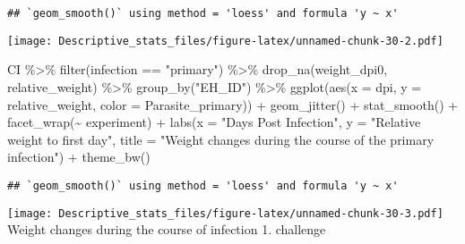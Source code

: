\documentclass[
]{article}
\newenvironment{Shaded}{\begin{snugshade}}{\end{snugshade}}
\newcommand{\AttributeTok}[1]{\textcolor[rgb]{0.77,0.63,0.00}{#1}}
\newcommand{\FunctionTok}[1]{\textcolor[rgb]{0.00,0.00,0.00}{#1}}
\newcommand{\NormalTok}[1]{#1}
\newcommand{\SpecialCharTok}[1]{\textcolor[rgb]{0.00,0.00,0.00}{#1}}
\newcommand{\StringTok}[1]{\textcolor[rgb]{0.31,0.60,0.02}{#1}}
\begin{document}
\begin{verbatim}
## `geom_smooth()` using method = 'loess' and formula 'y ~ x'
\end{verbatim}

\texttt{[image: Descriptive\_stats\_files/figure-latex/unnamed-chunk-30-2.pdf]}

\begin{Shaded}
\begin{Highlighting}[]
\NormalTok{CI }\SpecialCharTok{\%\textgreater{}\%} 
    \FunctionTok{filter}\NormalTok{(infection }\SpecialCharTok{==} \StringTok{"primary"}\NormalTok{) }\SpecialCharTok{\%\textgreater{}\%}
    \FunctionTok{drop\_na}\NormalTok{(weight\_dpi0, relative\_weight) }\SpecialCharTok{\%\textgreater{}\%}
    \FunctionTok{group\_by}\NormalTok{(}\StringTok{"EH\_ID"}\NormalTok{) }\SpecialCharTok{\%\textgreater{}\%}
    \FunctionTok{ggplot}\NormalTok{(}\FunctionTok{aes}\NormalTok{(}\AttributeTok{x =}\NormalTok{ dpi, }\AttributeTok{y =}\NormalTok{ relative\_weight, }\AttributeTok{color =}\NormalTok{ Parasite\_primary)) }\SpecialCharTok{+}
    \FunctionTok{geom\_jitter}\NormalTok{() }\SpecialCharTok{+}
    \FunctionTok{stat\_smooth}\NormalTok{() }\SpecialCharTok{+}
    \FunctionTok{facet\_wrap}\NormalTok{(}\SpecialCharTok{\textasciitilde{}}\NormalTok{ experiment) }\SpecialCharTok{+}
    \FunctionTok{labs}\NormalTok{(}\AttributeTok{x =} \StringTok{"Days Post Infection"}\NormalTok{, }\AttributeTok{y =} \StringTok{"Relative weight to first day"}\NormalTok{,}
         \AttributeTok{title =} \StringTok{"Weight changes during the course of the primary infection"}\NormalTok{) }\SpecialCharTok{+}
    \FunctionTok{theme\_bw}\NormalTok{()}
\end{Highlighting}
\end{Shaded}

\begin{verbatim}
## `geom_smooth()` using method = 'loess' and formula 'y ~ x'
\end{verbatim}

\texttt{[image: Descriptive\_stats\_files/figure-latex/unnamed-chunk-30-3.pdf]}
Weight changes during the course of infection 1. challenge
\end{document}
